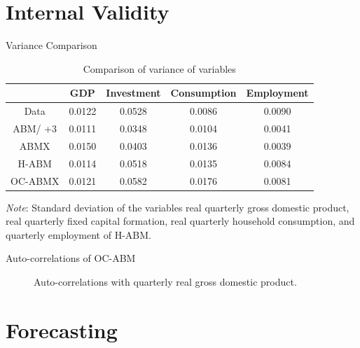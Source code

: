 \documentclass[9pt]{beamer}
\begin{document}
\section{Internal Validity}

\begin{frame}{Variance Comparison}
    \begin{table}[h!]
    \centering
    \caption{Comparison of variance of variables}
    \begin{tabular}{c|cccc}
    \hline
         &GDP &Investment&Consumption&Employment \\
         \hline \hline
        Data &0.0122&0.0528& 0.0086 &0.0090 \\ \midrule
        ABM/
        +3
        &    0.0111
 & 0.0348 &0.0104
 & 0.0041 \\
        ABMX &    0.0150
 &0.0403 & 0.0136& 0.0039 \\
        H-ABM&0.0114&0.0518&0.0135 & 0.0084 \\
        OC-ABMX &0.0121&0.0582&0.0176& 0.0081 \\
    \hline
    \end{tabular}
    	\begin{tablenotes}
		\footnotesize \item \textit{Note}: Standard deviation of the variables real quarterly gross domestic product, real quarterly fixed capital formation, real quarterly household consumption, and quarterly employment of H-ABM. 
	\end{tablenotes}
    \label{tab:std}
\end{table}
\label{returnvariance}
                    \hyperlink{Variance}{}
\end{frame}
\begin{frame}{Auto-correlations of OC-ABM}
    \begin{figure}
    \centering
    
		\caption{Auto-correlations with quarterly real gross domestic product.}
    \label{fig:autocorr-ABM}
\end{figure}
\label{autocorrelations}
                    \hyperlink{crosscorrelations}{}
\end{frame}
\section{Forecasting}
\end{document}
